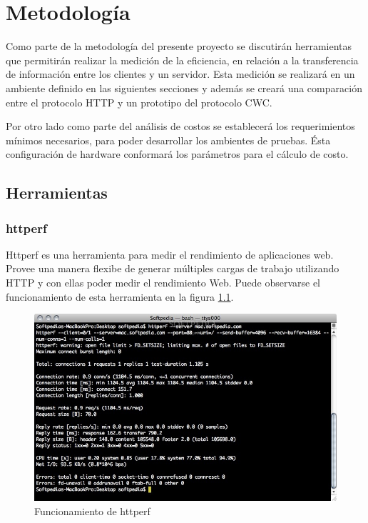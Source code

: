 
\chapter{Metodología} %

\label{ch:metodologia} %

Como parte de la metodología del presente proyecto se discutirán herramientas que permitirán realizar la medición de la eficiencia, en relación a la transferencia de información entre los clientes y un servidor. Esta medición se realizará en un ambiente definido en las siguientes secciones y además se creará una comparación entre el protocolo HTTP y un prototipo del protocolo CWC. 

Por otro lado como parte del análisis de costos se establecerá los requerimientos mínimos necesarios, para poder desarrollar los ambientes de pruebas. Ésta configuración de hardware conformará los parámetros para el cálculo de costo. 


\section{Herramientas}


\subsection{httperf}

Httperf es una herramienta para medir el rendimiento de aplicaciones web. Provee una manera flexibe de generar múltiples cargas de trabajo utilizando HTTP y con ellas poder medir el rendimiento Web. Puede observarse el funcionamiento de esta herramienta en la figura \ref{httperf}.

\begin{figure}[h]
  \centering
    \includegraphics[scale=0.4]{gfx/httperf}
  \caption{Funcionamiento de httperf}
  \label{httperf}
\end{figure}

